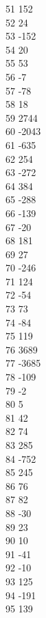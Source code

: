 { 51	152 \\
 52	24 \\
 53	-152 \\
 54	20 \\
 55	53 \\
 56	-7 \\
 57	-78 \\
 58	18 \\
 59	2744 \\
 60	-2043 \\
 61	-635 \\
 62	254 \\
 63	-272 \\
 64	384 \\
 65	-288 \\
 66	-139 \\
 67	-20 \\
 68	181 \\
 69	27 \\
 70	-246 \\
 71	124 \\
 72	-54 \\
 73	73 \\
 74	-84 \\
 75	119 \\
 76	3689 \\
 77	-3685 \\
 78	-109 \\
 79	-2 \\
 80	5 \\
 81	42 \\
 82	74 \\
 83	285 \\
 84	-752 \\
 85	245 \\
 86	76 \\
 87	82 \\
 88	-30 \\
 89	23 \\
 90	10 \\
 91	-41 \\
 92	-10 \\
 93	125 \\
 94	-191 \\
 95	139 \\
}
